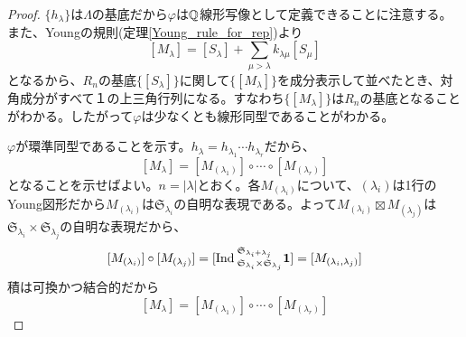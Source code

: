 \documentclass{ltjsreport}
\begin{document}
\begin{proof}
  $\{h_\lambda\}$は$\Lambda$の基底だから$\varphi$は$\mathbb{Q}$線形写像として定義できることに注意する。また、Youngの規則(定理\ref{Young_rule_for_rep})より
  \[
  [M_\lambda]=[S_\lambda]+\sum_{\mu>\lambda}k_{\lambda\mu}[S_\mu]
  \]
  となるから、$R_n$の基底$\{[S_\lambda]\}$に関して$\{[M_\lambda]\}$を成分表示して並べたとき、対角成分がすべて１の上三角行列になる。すなわち$\{[M_\lambda]\}$は$R_n$の基底となることがわかる。したがって$\varphi$は少なくとも線形同型であることがわかる。

  $\varphi$が環準同型であることを示す。$h_\lambda=h_{\lambda_1}\cdots h_{\lambda_r}$だから、
  \[
  [M_\lambda]=[M_{(\lambda_1)}]\circ\cdots\circ[M_{(\lambda_r)}]  
  \]
  となることを示せばよい。$n=|\lambda|$とおく。各$M_{(\lambda_i)}$について、$(\lambda_i)$は1行のYoung図形だから$M_{(\lambda_i)}$は$\mathfrak{S}_{\lambda_i}$の自明な表現である。よって$M_{(\lambda_i)}\boxtimes M_{(\lambda_j)}$は$\mathfrak{S}_{\lambda_i}\times\mathfrak{S}_{\lambda_j}$の自明な表現だから、
  \[
  [M_{(\lambda_i)}]\circ[M_{(\lambda_j)}]
  =[\text{Ind}\:_{\mathfrak{S}_{\lambda_i}\times\mathfrak{S}_{\lambda_j}}^{\mathfrak{S}_{\lambda_i+\lambda_j}}\mathbf{1}]
  =[M_{(\lambda_i,\lambda_j)}]
  \]
  積は可換かつ結合的だから
  \[
  [M_\lambda]=[M_{(\lambda_1)}]\circ\cdots\circ[M_{(\lambda_r)}]  
  \]
  

\end{proof}
\end{document}
